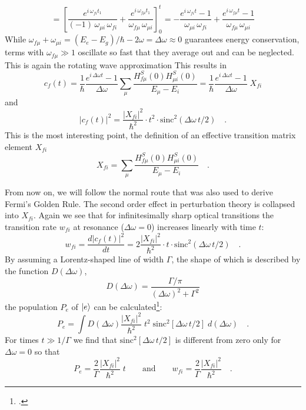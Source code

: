 \begin{equation}
= \left[  \frac{e^{i \,\omega_{fi} t_1}}{(-1)
\,\omega_{\mu i} \, \omega_{fi}} %
+   \frac{e^{i \,\omega_{ f \mu } t_1}}{\omega_{f \mu}\,
\omega_{\mu i}} \right]_0^t %
= -  \frac{e^{i \,\omega_{fi} t} -1}{
\omega_{\mu i} \, \omega_{fi} } %
+   \frac{e^{i \,\omega_{ f \mu } t} -1}{\omega_{f \mu}\,
\omega_{\mu i}}  %
\label{eq:tpe_outer_integral}
\end{equation}
While $\omega_{f \mu}+\omega_{ \mu i}= (E_e - E_g)/ \hbar - 2 \omega = \Delta \omega \approx 0$ guarantees  energy conservation,  terms with 
 $\omega_{f \mu} \gg 1$ oscillate so fast that they average out and can be neglected. This is again the rotating wave approximation This results in
\begin{equation}
c_f(t) =  \frac{1}{\hbar} \frac{e^{i \,\Delta \omega t} -1}{
\Delta \omega } \sum_{\mu} \frac{H^S_{f \mu} (0) H^S_{\mu i}
(0)}{E_{\mu} - E_i} =  \frac{1}{\hbar} \frac{e^{i \,\Delta \omega t}
-1}{ \Delta \omega } \; X_{fi}
\end{equation}
and
\begin{equation}
|c_f(t)|^2 = \frac{|X_{fi}|^2}{\hbar^2} \cdot t^2 \cdot
\text{sinc}^2(\Delta \omega \,t / 2) \quad .
\end{equation}
This is the most interesting point, the definition of an effective transition  matrix element $X_{fi}$
\begin{equation}
X_{fi} = \sum_{\mu} \frac{H^S_{f \mu} (0) H^S_{\mu i}
(0)}{E_{\mu} - E_i}  \quad .
\end{equation}

From now on, we will follow the normal route that was also used to derive Fermi's Golden Rule. The second order effect in perturbation theory is collapsed into $X_{fi}$. Again we see that for infinitesimally sharp optical transitions the transition rate $w_{fi}$ at resonance ($\Delta \omega = 0$) increases linearly with time $t$:
\begin{equation}
 w_{fi} = \frac{d |c_f(t)|^2}{dt} = 2 \frac{|X_{fi}|^2}{\hbar^2} \cdot t \cdot
\text{sinc}^2(\Delta \omega \,t / 2) \quad .
\end{equation}
By assuming a Lorentz-shaped line of width $\Gamma$, the shape of which is described by the function $D(\Delta \omega)$,
\begin{equation}
D(\Delta \omega) = \frac{\Gamma / \pi}{(\Delta \omega)^2 +
\Gamma^2}
\end{equation}
the population $P_e$ of $\ket{e}$ can be calculated\footcite{mystre_quantum_optics}:
\begin{equation}
P_e = \int D(\Delta \omega) \frac{|X_{fi}|^2}{\hbar^2} \; t^2 \;
\text{sinc}^2\left[ \Delta \omega  \,t / 2 \right] \; d (\Delta
\omega) \quad .
\end{equation}
For times $t \gg 1 / \Gamma$ we find that $\text{sinc}^2\left[ \Delta \omega \,t / 2 \right]$ is different from zero only for $\Delta \omega = 0$  so that
\begin{equation}
P_e =  \frac{2}{ \Gamma} \frac{|X_{fi}|^2}{ \hbar^2} \; t \qquad
\text{and} \qquad w_{fi} =  \frac{2}{ \Gamma} \frac{|X_{fi}|^2}{
\hbar^2} \quad . \label{eq:tpe_pe_xfi}
\end{equation}

